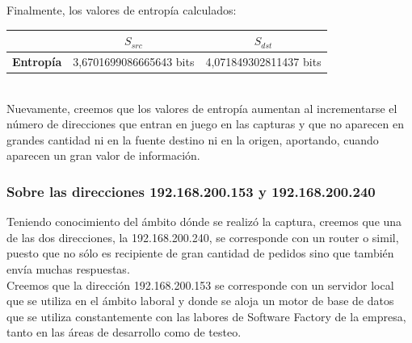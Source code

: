 \indent Finalmente, los valores de entropía calculados:\\

\begin{centering}
	\begin{tabular}{ | c | c | c |} \hline
	   & \textbf{$S_{src}$} & \textbf{$S_{dst}$} \\ \hline
	  	\textbf{Entropía} & 3,6701699086665643 bits & 4,071849302811437 bits \\ \hline
	\end{tabular}
\end{centering}\\

\indent Nuevamente, creemos que los valores de entropía aumentan al incrementarse el número de direcciones que entran en juego en las capturas y que no aparecen en grandes cantidad ni en la fuente destino ni en la origen, aportando, cuando aparecen un gran valor de información.\\


\subsubsection{Sobre las direcciones 192.168.200.153 y 192.168.200.240}

\indent Teniendo conocimiento del ámbito dónde se realizó la captura, creemos que una de las dos direcciones, la 192.168.200.240, se corresponde con un router o simil, puesto que no sólo es recipiente de gran cantidad de pedidos sino que también envía muchas respuestas.\\
\indent Creemos que la dirección 192.168.200.153 se corresponde con un servidor local que se utiliza en el ámbito laboral y donde se aloja un motor de base de datos que se utiliza constantemente con las labores de Software Factory de la empresa, tanto en las áreas de desarrollo como de testeo.\\